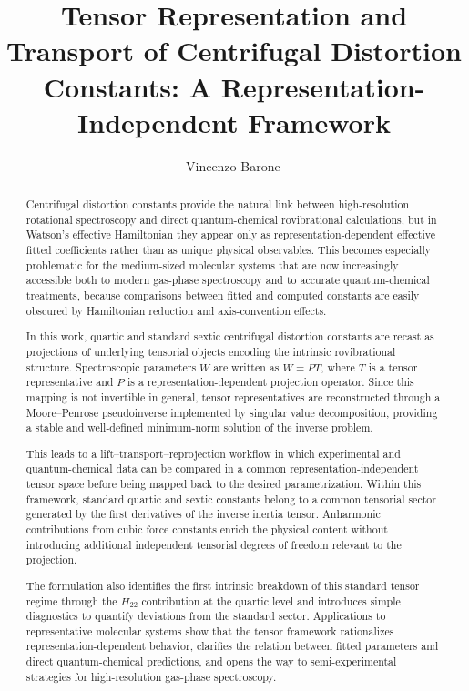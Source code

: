 \documentclass[aip,jcp,reprint,floatfix]{revtex4-2}
\begin{document}
\title{Tensor Representation and Transport of Centrifugal Distortion Constants: A Representation-Independent Framework}

\author{Vincenzo Barone\,}


\begin{abstract}
Centrifugal distortion constants provide the natural link between
high-resolution rotational spectroscopy and direct quantum-chemical
rovibrational calculations, but in Watson's effective Hamiltonian they
appear only as representation-dependent effective fitted coefficients
rather than as unique physical observables. This becomes especially problematic
for the medium-sized molecular systems that are now increasingly
accessible both to modern gas-phase spectroscopy and to accurate
quantum-chemical treatments, because comparisons between fitted and
computed constants are easily obscured by Hamiltonian reduction and
axis-convention effects.

In this work, quartic and standard sextic centrifugal distortion
constants are recast as projections of underlying tensorial objects
encoding the intrinsic rovibrational structure. Spectroscopic
parameters $W$ are written as $W = PT$, where $T$ is a tensor
representative and $P$ is a representation-dependent projection
operator. Since this mapping is not invertible in general, tensor
representatives are reconstructed through a Moore--Penrose
pseudoinverse implemented by singular value decomposition, providing a
stable and well-defined minimum-norm solution of the inverse problem.

This leads to a lift--transport--reprojection workflow in which
experimental and quantum-chemical data can be compared in a common
representation-independent tensor space before being mapped back to the
desired parametrization. Within this framework, standard quartic and
sextic constants belong to a common tensorial sector generated by the
first derivatives of the inverse inertia tensor. Anharmonic
contributions from cubic force constants enrich the physical content
without introducing additional independent tensorial degrees of
freedom relevant to the projection.

The formulation also identifies the first intrinsic breakdown of this
standard tensor regime through the $H_{22}$ contribution at the quartic
level and introduces simple diagnostics to quantify deviations from the
standard sector. Applications to representative molecular systems show
that the tensor framework rationalizes representation-dependent
behavior, clarifies the relation between fitted parameters and direct
quantum-chemical predictions, and opens the way to semi-experimental
strategies for high-resolution gas-phase spectroscopy.
\end{abstract}
\end{document}
